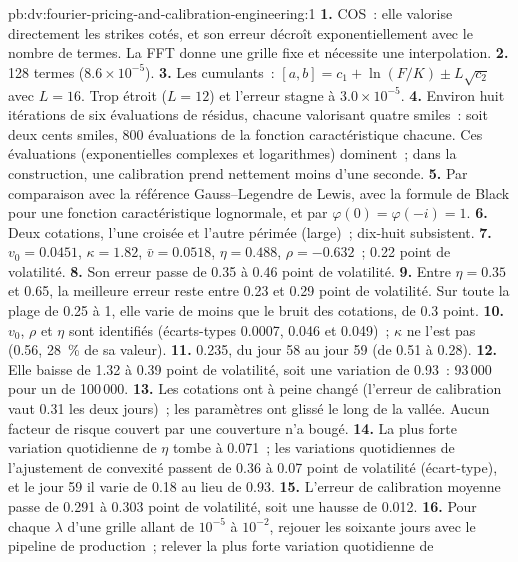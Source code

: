 \begin{solution}{pb:dv:fourier-pricing-and-calibration-engineering:1}
\textbf{1.} COS~: elle valorise directement les strikes cotés, et son erreur décroît exponentiellement avec le nombre de termes. La FFT donne une grille fixe et nécessite
une interpolation.
\textbf{2.} 128 termes ($8.6\times10^{-5}$).
\textbf{3.} Les cumulants~: $[a,b]=c_1+\ln(F/K)\pm L\sqrt{c_2}$ avec $L=16$. Trop étroit ($L=12$) et l'erreur stagne à $3.0\times10^{-5}$.
\textbf{4.} Environ huit itérations de six évaluations de résidus, chacune valorisant quatre smiles~: soit deux cents smiles, 800 évaluations de la fonction caractéristique
chacune. Ces évaluations (exponentielles complexes et logarithmes) dominent~; dans la construction, une calibration prend nettement moins d'une seconde.
\textbf{5.} Par comparaison avec la référence Gauss--Legendre de Lewis, avec la formule de Black pour une fonction caractéristique lognormale, et par $\varphi(0)=
\varphi(-i)=1$.
\textbf{6.} Deux cotations, l'une croisée et l'autre périmée (large)~; dix-huit subsistent.
\textbf{7.} $v_0=0.0451$, $\kappa=1.82$, $\bar v=0.0518$, $\eta=0.488$, $\rho=-0.632$~; 0.22 point de volatilité.
\textbf{8.} Son erreur passe de 0.35 à 0.46 point de volatilité.
\textbf{9.} Entre $\eta=0.35$ et 0.65, la meilleure erreur reste entre 0.23 et 0.29 point de volatilité. Sur toute la plage de 0.25 à 1, elle varie de
moins que le bruit des cotations, de 0.3 point.
\textbf{10.} $v_0$, $\rho$ et $\eta$ sont identifiés (écarts-types 0.0007, 0.046 et 0.049)~; $\kappa$ ne l'est pas (0.56, 28~\% de sa valeur).
\textbf{11.} 0.235, du jour 58 au jour 59 (de 0.51 à 0.28).
\textbf{12.} Elle baisse de 1.32 à 0.39 point de volatilité, soit une variation de 0.93~: 93\,000 pour un  de 100\,000.
\textbf{13.} Les cotations ont à peine changé (l'erreur de calibration vaut 0.31 les deux jours)~; les paramètres ont glissé le long de la vallée. Aucun facteur de risque couvert par une couverture
n'a bougé.
\textbf{14.} La plus forte variation quotidienne de $\eta$ tombe à 0.071~; les variations quotidiennes de l'ajustement de convexité passent de 0.36 à 0.07 point de volatilité
(écart-type), et le jour 59 il varie de 0.18 au lieu de 0.93.
\textbf{15.} L'erreur de calibration moyenne passe de 0.291 à 0.303 point de volatilité, soit une hausse de 0.012.
\textbf{16.} Pour chaque $\lambda$ d'une grille allant de $10^{-5}$ à $10^{-2}$, rejouer les soixante jours avec le pipeline de production~; relever la plus forte variation quotidienne de

\end{solution}
